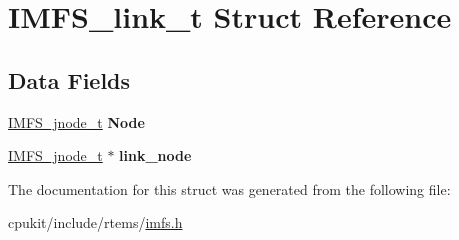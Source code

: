 \hypertarget{structIMFS__link__t}{}\section{I\+M\+F\+S\+\_\+link\+\_\+t Struct Reference}
\label{structIMFS__link__t}
\subsection*{Data Fields}
\begin{DoxyCompactItemize}
\item 
\mbox{\label{structIMFS__link__t_a13e1fb59141fa88a1da65815128fbed7}} 
\mbox{\hyperlink{structIMFS__jnode__tt}{I\+M\+F\+S\+\_\+jnode\+\_\+t}} {\bfseries Node}
\item 
\mbox{\label{structIMFS__link__t_a9aaf4a6ce904e452677c68d74e916627}} 
\mbox{\hyperlink{structIMFS__jnode__tt}{I\+M\+F\+S\+\_\+jnode\+\_\+t}} $\ast$ {\bfseries link\+\_\+node}
\end{DoxyCompactItemize}


The documentation for this struct was generated from the following file\+:\begin{DoxyCompactItemize}
\item 
cpukit/include/rtems/\mbox{\hyperlink{imfs_8h}{imfs.\+h}}\end{DoxyCompactItemize}
